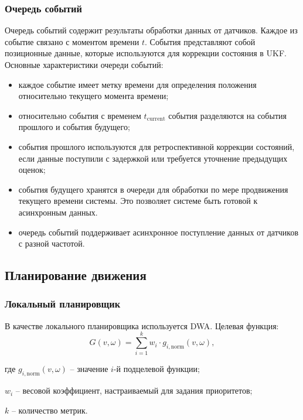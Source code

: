 \subsubsection{Очередь событий}
\label{subsec:event_queue}

Очередь событий содержит результаты обработки данных от датчиков. Каждое из событие связано с моментом времени $t$.
События представляют собой позиционные данные, которые используются для коррекции состояния в UKF.
Основные характеристики очереди событий:
\begin{itemize}
    \item каждое событие имеет метку времени для определения положения относительно текущего момента времени;
    \item относительно события с временем $t_{\text{current}}$ события разделяются на события прошлого и события будущего;
    \item события прошлого используются для ретроспективной коррекции состояний, если данные поступили с задержкой или требуется уточнение предыдущих оценок;
    \item события будущего хранятся в очереди для обработки по мере продвижения текущего времени системы. Это позволяет системе быть готовой к асинхронным данных.
    \item очередь событий поддерживает асинхронное поступление данных от датчиков с разной частотой. 
\end{itemize}

\subsection{Планирование движения}

\subsubsection{Локальный планировщик}
В качестве локального планировщика используется DWA.
Целевая функция:
\begin{equation}
	G(v, \omega) = \sum_{i=1}^k w_i \cdot g_{i, \text{norm}}(v, \omega),
\end{equation}

\begin{explanationx}
	\item[где] $g_{i,\text{norm}}(v, \omega)$ -- значение $i$-й подцелевой функции;
	\item $w_i$ -- весовой коэффициент,
		настраиваемый для задания приоритетов;
	\item $k$ -- количество метрик.
\end{explanationx}

